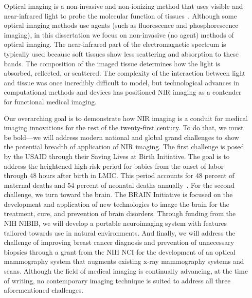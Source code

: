 Optical imaging is a non-invasive and non-ionizing method that uses visible and near-infrared light to probe the molecular function of tissues~\cite{Nunez2018}. Although some optical imaging methods use agents (such as fluorescence and phosphorescence imaging), in this dissertation we focus on non-invasive (no agent) methods of optical imaging. The near-infrared part of the electromagnetic spectrum is typically used because soft tissues show less scattering and absorption to these bands. The composition of the imaged tissue determines how the light is absorbed, reflected, or scattered. The complexity of the interaction between light and tissue was once incredibly difficult to model, but technological advances in computational methods and devices has positioned \ac{NIR} imaging as a contender for functional medical imaging.

Our overarching goal is to demonstrate how \ac{NIR} imaging is a conduit for medical imaging innovations for the rest of the twenty-first century. To do that, we must be bold---we will address modern national and global grand challenges to show the potential breadth of application of \ac{NIR} imaging. The first challenge is posed by the \ac{USAID} through their Saving Lives at Birth Initiative. The goal is to address the heightened high-risk period for babies from the onset of labor through 48 hours after birth in \ac{LMIC}. This period accounts for 48 percent of maternal deaths and 54 percent of neonatal deaths annually~\cite{SLAB2021}. For the second challenge, we turn toward the brain. The \ac{BRAIN} Initiative is focused on the development and application of new technologies to image the brain for the treatment, cure, and prevention of brain disorders. Through funding from the \ac{NIH} \ac{NIBIB}, we will develop a portable neuroimaging system with features tailored towards use in natural environments. And finally, we will address the challenge of improving breast cancer diagnosis and prevention of unnecessary biopsies through a grant from the \ac{NIH} \ac{NCI} for the development of an optical mammography system that augments existing x-ray mammography systems and scans. Although the field of medical imaging is continually advancing, at the time of writing, no contemporary imaging technique is suited to address all three aforementioned challenges. 


